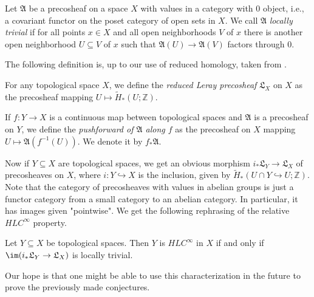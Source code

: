 \begin{defi}
Let $\mathfrak{A}$ be a precosheaf on a space $X$ with values in a category with 0 object, i.e., a covariant functor on the poset category of open sets in $X$. We call $\mathfrak{A}$ \emph{locally trivial} if for all points $x\in X$ and all open neighborhoods $V$ of $x$ there is another open neighborhood $U\subseteq V$ of $x$ such that $\mathfrak{A}(U)\to\mathfrak{A}(V)$ factors through 0.
\end{defi}

The following definition is, up to our use of reduced homology, taken from \cite{Curry.2015}.

\begin{defi}
For any topological space $X$, we define the \emph{reduced Leray precosheaf} $\mathfrak{L}_X$ on $X$ as the precosheaf mapping $U\mapsto \tilde{H}_*(U;\mathbb{Z})$.
\end{defi}

\begin{defi}
If $f\colon Y\to X$ is a continuous map between topological spaces and $\mathfrak{A}$ is a precosheaf on $Y$, we define the \emph{pushforward of $\mathfrak{A}$ along $f$} as the precosheaf on $X$ mapping $U\mapsto\mathfrak{A}(f^{-1}(U))$. We denote it by $f_*\mathfrak{A}$.
\end{defi}

Now if $Y\subseteq X$ are topological spaces, we get an obvious morphism $i_*\mathfrak{L}_Y\to\mathfrak{L}_X$ of precosheaves on $X$, where $i\colon Y\hookrightarrow X$ is the inclusion, given by $\tilde{H}_*(U\cap Y\hookrightarrow U;\mathbb{Z})$. Note that the category of precosheaves with values in abelian groups is just a functor category from a small category to an abelian category. In particular, it has images given "pointwise". We get the following rephrasing of the relative $HLC^{\infty}$ property.

\begin{prop}
Let $Y\subseteq X$ be topological spaces. Then $Y$ is $HLC^{\infty}$ in $X$ if and only if $\im(i_*\mathfrak{L}_Y\to\mathfrak{L}_X)$ is locally trivial.
\end{prop}

Our hope is that one might be able to use this characterization in the future to prove the previously made conjectures.

